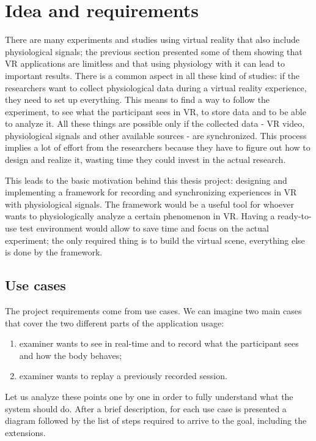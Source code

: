 \documentclass[binding=0.6cm,LaM]{sapthesis}
\begin{document}
\section{Idea and requirements}
There are many experiments and studies using virtual reality that also include physiological signals; the previous section presented some of them showing that VR applications are limitless and that using physiology with it can lead to important results.
There is a common aspect in all these kind of studies: if the researchers want to collect physiological data during a virtual reality experience, they need to set up everything. This means to find a way to follow the experiment, to see what the participant sees in VR, to store data and to be able to analyze it. All these things are possible only if the collected data - VR video, physiological signals and other available sources - are synchronized. This process implies a lot of effort from the researchers because they have to figure out how to design and realize it, wasting time they could invest in the actual research.

This leads to the basic motivation behind this thesis project: designing and implementing a framework for recording and synchronizing experiences in VR with physiological signals. The framework would be a useful tool for whoever wants to physiologically analyze a certain phenomenon in VR. Having a ready-to-use test environment would allow to save time and focus on the actual experiment; the only required thing is to build the virtual scene, everything else is done by the framework.

\subsection{Use cases}
The project requirements come from use cases. We can imagine two main cases that cover the two different parts of the application usage:

\begin{enumerate}

\item examiner wants to see in real-time and to record what the participant sees and how the body behaves;

\item examiner wants to replay a previously recorded session.

\end{enumerate}

Let us analyze these points one by one in order to fully understand what the system should do. After a brief description, for each use case is presented a diagram followed by the list of steps required to arrive to the goal, including the extensions.
\end{document}
